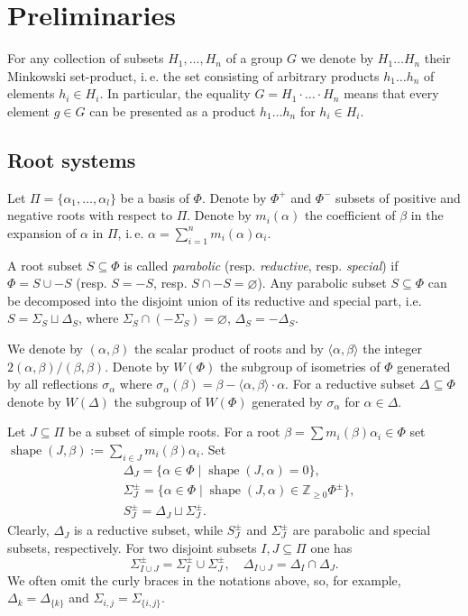 \documentclass[12pt]{amsart}
\theoremstyle{plain} \declaretheorem[name=Theorem, Refname={Theorem,Theorems}]{thm} \Crefname{thm}{Theorem}{Theorems}
\numberwithin{equation}{section}
\theoremstyle{definition} \newtheorem{dfn}[lemma]{Definition} \Crefname{dfn}{Definition}{Definitions}
\theoremstyle{remark} \newtheorem{rem}[lemma]{Remark} \Crefname{rem}{Remark}{Remarks}
\DeclareMathOperator{\shape}{shape}
\begin{document}
\section{Preliminaries}\label{sec:prelim}
For any collection of subsets $H_1,\ldots, H_n$ of a group $G$ we denote by $H_1\ldots H_n$ their Minkowski set-product,
i.\,e. the set consisting of arbitrary products $h_1\ldots h_n$ of elements $h_i\in H_i$. In particular, the equality
$G = H_1\cdot\ldots\cdot H_n$ means that every element $g\in G$ can be presented as a product $h_1\ldots h_n$ for $h_i\in H_i$.

\subsection{Root systems}\label{sec:rootsys}
Let $\Pi=\{\alpha_1, \ldots, \alpha_l\}$ be a basis of $\Phi$. Denote by $\Phi^+$ and $\Phi^-$ subsets of positive and negative roots with respect to $\Pi$.
Denote by $m_i(\alpha)$ the coefficient of $\beta$ in the expansion of $\alpha$ in $\Pi$, i.\,e. $\alpha = \sum_{i=1}^n m_i(\alpha) \alpha_i$.

A root subset $S\subseteq \Phi$ is called {\it parabolic} (resp. {\it reductive}, resp. {\it special}) if $\Phi=S \cup -S$ (resp. $S = -S$, resp. $S \cap -S=\varnothing$).
Any parabolic subset $S \subseteq \Phi$ can be decomposed into the disjoint union of its reductive and special part, i.e. 
$S = \Sigma_S \sqcup \Delta_S$, where $\Sigma_S \cap (-\Sigma_S) = \varnothing$, $\Delta_S = -\Delta_S$.

We denote by $(\alpha, \beta)$ the scalar product of roots and by $\langle \alpha, \beta\rangle$ the integer $2(\alpha, \beta)/(\beta, \beta)$.
Denote by $W(\Phi)$ the subgroup of isometries of $\Phi$ generated by all reflections $\sigma_\alpha$ where $\sigma_\alpha(\beta)=\beta-\langle\alpha,\beta \rangle\cdot \alpha$.
For a reductive subset $\Delta\subseteq \Phi$ denote by $W(\Delta)$ the subgroup of $W(\Phi)$ generated by $\sigma_\alpha$ for $\alpha\in\Delta$.

Let $J\subseteq \Pi$ be a subset of simple roots. 
For a root $\beta = \sum m_i(\beta)\alpha_i \in \Phi$ set $\shape(J, \beta):=\sum\limits_{i\in J} m_i(\beta) \alpha_i$.
Set
\begin{align*}
& \Delta_J = \{\alpha \in \Phi \mid \shape(J, \alpha)=0\},\\
& \Sigma^\pm_J = \{\alpha \in \Phi \mid \shape(J, \alpha) \in \mathbb{Z}_{\geqslant0} \Phi^\pm \},\\
& S_J^\pm = \Delta_J \sqcup \Sigma_J^\pm.
\end{align*}
Clearly, $\Delta_J$ is a reductive subset, while $S^\pm_J$ and $\Sigma^\pm_J$ are parabolic and special subsets, respectively.
For two disjoint subsets $I, J\subseteq \Pi$ one has 
\[ \Sigma^\pm_{I \cup J} = \Sigma^\pm_I\cup\Sigma^\pm_J, \quad \Delta_{I\cup J} = \Delta_I \cap \Delta_J. \]
We often omit the curly braces in the notations above, so, for example, $\Delta_k=\Delta_{\{k\}}$ and $\Sigma_{i,j}=\Sigma_{\{i,j\}}$.
\end{document}

